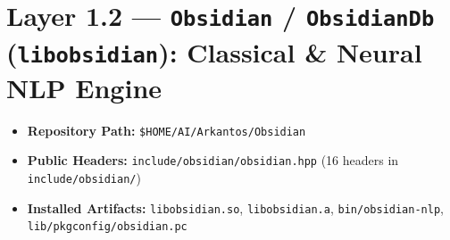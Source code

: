 \documentclass[11pt,a4paper]{article}
\begin{document}
\section{Layer 1.2 --- \texttt{Obsidian} / \texttt{ObsidianDb} (\texttt{libobsidian}): Classical \& Neural NLP Engine}

\begin{itemize}[leftmargin=1.5em,itemsep=1pt]
  \item \textbf{Repository Path:} \texttt{\$HOME/AI/Arkantos/Obsidian}
  \item \textbf{Public Headers:} \texttt{include/obsidian/obsidian.hpp} (16 headers in \texttt{include/obsidian/})
  \item \textbf{Installed Artifacts:} \texttt{libobsidian.so}, \texttt{libobsidian.a}, \texttt{bin/obsidian-nlp}, \texttt{lib/pkgconfig/obsidian.pc}
\end{itemize}
\end{document}
